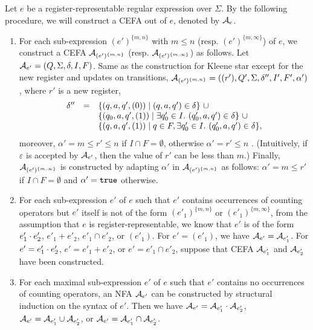 Let $e$ be a register-representable regular expression over $\Sigma$. By the following procedure, we will construct a CEFA out of $e$, denoted by $\mathcal{A}_e$. 
\begin{enumerate}
%
\item For each sub-expression $(e')^{\{m,n\}}$ with $m \le n$ (resp. $(e')^{\{m, \infty\}}$) of $e$, we construct a CEFA $\mathcal{A}_{(e')^{\{m,n\}}}$ (resp. $\mathcal{A}_{(e')^{\{m, \infty\}}}$) as follows. Let $\mathcal{A}_{e'} = (Q, \Sigma, \delta, I, F)$. Same as the construction for Kleene star except for the new register and updates on transitions, $\mathcal{A}_{(e')^{\{m,n\}}} = ((r'), Q', \Sigma, \delta'', I', F', \alpha')$, where $r'$ is a new register, 
%
$$
\begin{array}{l c l}
\delta'' & = & \{(q, a, q', (0)) \mid (q, a, q') \in \delta\}\  \cup \\
& & \{(q_0, a, q', (1))  \mid \exists q'_0 \in I.\ (q'_0, a, q') \in \delta\}\ \cup \\
& & \{(q, a, q', (1)) \mid q \in F, \exists q'_0 \in I.\ (q'_0, a, q') \in \delta\},
\end{array}
$$ 
%
moreover, $\alpha' = m \le r' \le n$ if $I \cap F = \emptyset$, otherwise $\alpha' = r' \le n$ .  (Intuitively, if $\varepsilon$ is accepted by $\mathcal{A}_{e'}$, then the value of $r'$ can be less than $m$.) Finally, $\mathcal{A}_{(e')^{\{m, \infty\}}}$ is constructed by adapting $\alpha'$ in $\mathcal{A}_{(e')^{\{m,n\}}}$ as follows: $\alpha' = m \le r'$ if $I \cap F = \emptyset$ and $\alpha' = \mathtt{true}$ otherwise. 
%

\item For each sub-expression $e'$ of $e$ such that $e'$ contains occurrences of counting operators but $e'$ itself is not of the form $(e'_1)^{\{m,n\}}$ or $(e'_1)^{\{m,\infty\}}$, from the assumption that $e$ is register-representable, we know that $e'$ is of the form $e'_1 \cdot e'_2$, $e'_1 + e'_2$, $e'_1 \cap e'_2$, or $(e'_1)$. For $e' = (e'_1)$, we have $\mathcal{A}_{e'} = \mathcal{A}_{e'_1}$. For $e' = e'_1 \cdot e'_2$, $e' = e'_1 + e'_2$, or $e' = e'_1 \cap e'_2$, suppose that CEFA $\mathcal{A}_{e'_1}$ and $\mathcal{A}_{e'_2}$ have been constructed. 

\item For each maximal sub-expression $e'$ of $e$ such that $e'$ contains no occurrences of counting operators, an NFA $\mathcal{A}_{e'}$ can be constructed by structural induction on the syntax of $e'$. 
Then we have $\mathcal{A}_{e'} = \mathcal{A}_{e'_1} \cdot \mathcal{A}_{e'_2}$, $\mathcal{A}_{e'} = \mathcal{A}_{e'_1} \cup \mathcal{A}_{e'_2}$, or $\mathcal{A}_{e'} = \mathcal{A}_{e'_1} \cap \mathcal{A}_{e'_2}$. 
\end{enumerate}

